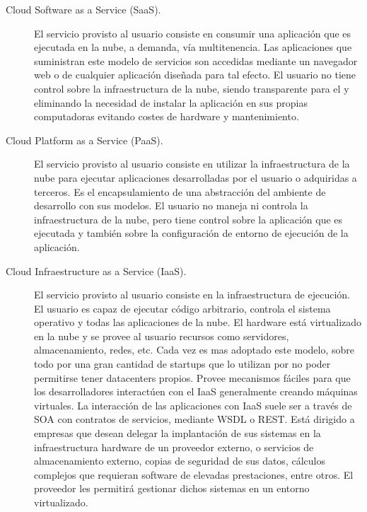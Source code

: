 \begin{description}
    \item[Cloud Software as a Service (SaaS).] El servicio provisto al usuario consiste en consumir una aplicación que es ejecutada en la nube, a demanda, vía multitenencia. Las aplicaciones que suministran este modelo de servicios son accedidas mediante un navegador web o de cualquier aplicación diseñada para tal efecto.
        El usuario no tiene control sobre la infraestructura de la nube, siendo transparente para el y eliminando la necesidad de instalar la aplicación en sus propias computadoras evitando costes de hardware y mantenimiento.

    \item[Cloud Platform as a Service (PaaS).] El servicio provisto al usuario consiste en utilizar la infraestructura de la nube para ejecutar aplicaciones desarrolladas por el usuario o adquiridas a terceros.
        Es el encapsulamiento de una abstracción del ambiente de desarrollo con sus modelos.
        El usuario no maneja ni controla la infraestructura de la nube, pero tiene control sobre la aplicación que es ejecutada y también sobre la configuración de entorno de ejecución de la aplicación.

    \item[Cloud Infraestructure as a Service (IaaS).] El servicio provisto al usuario consiste en la infraestructura de ejecución. El usuario es capaz de ejecutar código arbitrario, controla el sistema operativo y todas las aplicaciones de la nube.
        El hardware está virtualizado en la nube y se provee al usuario recursos como servidores, almacenamiento, redes, etc. Cada vez es mas adoptado este modelo, sobre todo por una gran cantidad de startups que lo utilizan por no poder permitirse tener datacenters propios. Provee mecanismos fáciles para que los desarrolladores interactúen con el IaaS generalmente creando máquinas virtuales. La interacción de las aplicaciones con IaaS suele ser a través de SOA con contratos de servicios, mediante WSDL o REST.
        Está dirigido a empresas que desean delegar la implantación de sus sistemas  en la infraestructura hardware de un proveedor externo, o servicios de almacenamiento externo, copias de seguridad de sus datos, cálculos complejos que requieran software de elevadas prestaciones, entre otros. El proveedor les permitirá gestionar dichos sistemas en un entorno virtualizado.

\end{description}

